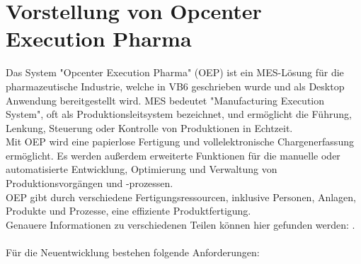 \documentclass[ngerman]{article}
\begin{document}
    \section{Vorstellung von Opcenter Execution Pharma}
    \label{VorstellungOEP}
    Das System "Opcenter Execution Pharma" (OEP) ist ein MES-Lösung für die pharmazeutische Industrie, welche in VB6 geschrieben wurde und als Desktop Anwendung bereitgestellt wird. MES bedeutet "Manufacturing Execution System", oft als Produktionsleitsystem bezeichnet, und ermöglicht die Führung, Lenkung, Steuerung oder Kontrolle von Produktionen in Echtzeit.\\
    Mit OEP wird eine papierlose Fertigung und vollelektronische Chargenerfassung ermöglicht. Es werden außerdem erweiterte Funktionen für die manuelle oder automatisierte Entwicklung, Optimierung und Verwaltung von Produktionsvorgängen und -prozessen.\\
    OEP gibt durch verschiedene Fertigungsressourcen, inklusive Personen, Anlagen, Produkte und Prozesse, eine effiziente Produktfertigung.\\
    Genauere Informationen zu verschiedenen Teilen können hier gefunden werden: \cite{OEP Main Page}.\\\\
    Für die Neuentwicklung bestehen folgende Anforderungen:
\end{document}
